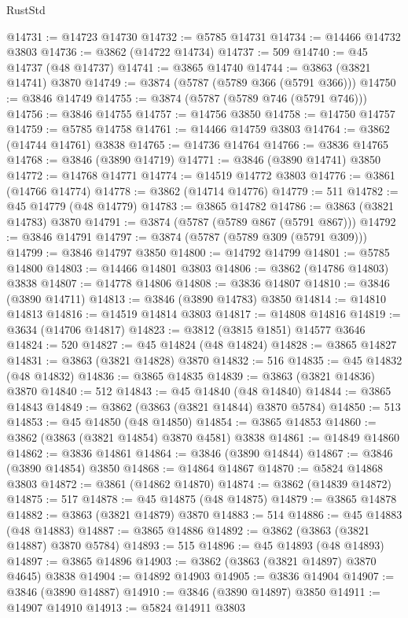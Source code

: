 \begin{lexlean}{RustStd}
\begin{coremodule}
@14731 := @14723 @14730
@14732 := @5785 @14731
@14734 := @14466 @14732 @3803
@14736 := @3862 (@14722 @14734)
@14737 := 509
@14740 := @45 @14737 (@48 @14737)
@14741 := @3865 @14740
@14744 := @3863 (@3821 @14741) @3870
@14749 := @3874 (@5787 (@5789 @366 (@5791 @366)))
@14750 := @3846 @14749
@14755 := @3874 (@5787 (@5789 @746 (@5791 @746)))
@14756 := @3846 @14755
@14757 := @14756 @3850
@14758 := @14750 @14757
@14759 := @5785 @14758
@14761 := @14466 @14759 @3803
@14764 := @3862 (@14744 @14761) @3838
@14765 := @14736 @14764
@14766 := @3836 @14765
@14768 := @3846 (@3890 @14719)
@14771 := @3846 (@3890 @14741) @3850
@14772 := @14768 @14771
@14774 := @14519 @14772 @3803
@14776 := @3861 (@14766 @14774)
@14778 := @3862 (@14714 @14776)
@14779 := 511
@14782 := @45 @14779 (@48 @14779)
@14783 := @3865 @14782
@14786 := @3863 (@3821 @14783) @3870
@14791 := @3874 (@5787 (@5789 @867 (@5791 @867)))
@14792 := @3846 @14791
@14797 := @3874 (@5787 (@5789 @309 (@5791 @309)))
@14799 := @3846 @14797 @3850
@14800 := @14792 @14799
@14801 := @5785 @14800
@14803 := @14466 @14801 @3803
@14806 := @3862 (@14786 @14803) @3838
@14807 := @14778 @14806
@14808 := @3836 @14807
@14810 := @3846 (@3890 @14711)
@14813 := @3846 (@3890 @14783) @3850
@14814 := @14810 @14813
@14816 := @14519 @14814 @3803
@14817 := @14808 @14816
@14819 := @3634 (@14706 @14817)
@14823 := @3812 (@3815 @1851) @14577 @3646
@14824 := 520
@14827 := @45 @14824 (@48 @14824)
@14828 := @3865 @14827
@14831 := @3863 (@3821 @14828) @3870
@14832 := 516
@14835 := @45 @14832 (@48 @14832)
@14836 := @3865 @14835
@14839 := @3863 (@3821 @14836) @3870
@14840 := 512
@14843 := @45 @14840 (@48 @14840)
@14844 := @3865 @14843
@14849 := @3862 (@3863 (@3821 @14844) @3870 @5784)
@14850 := 513
@14853 := @45 @14850 (@48 @14850)
@14854 := @3865 @14853
@14860 := @3862 (@3863 (@3821 @14854) @3870 @4581) @3838
@14861 := @14849 @14860
@14862 := @3836 @14861
@14864 := @3846 (@3890 @14844)
@14867 := @3846 (@3890 @14854) @3850
@14868 := @14864 @14867
@14870 := @5824 @14868 @3803
@14872 := @3861 (@14862 @14870)
@14874 := @3862 (@14839 @14872)
@14875 := 517
@14878 := @45 @14875 (@48 @14875)
@14879 := @3865 @14878
@14882 := @3863 (@3821 @14879) @3870
@14883 := 514
@14886 := @45 @14883 (@48 @14883)
@14887 := @3865 @14886
@14892 := @3862 (@3863 (@3821 @14887) @3870 @5784)
@14893 := 515
@14896 := @45 @14893 (@48 @14893)
@14897 := @3865 @14896
@14903 := @3862 (@3863 (@3821 @14897) @3870 @4645) @3838
@14904 := @14892 @14903
@14905 := @3836 @14904
@14907 := @3846 (@3890 @14887)
@14910 := @3846 (@3890 @14897) @3850
@14911 := @14907 @14910
@14913 := @5824 @14911 @3803

\end{coremodule}
\end{lexlean}
